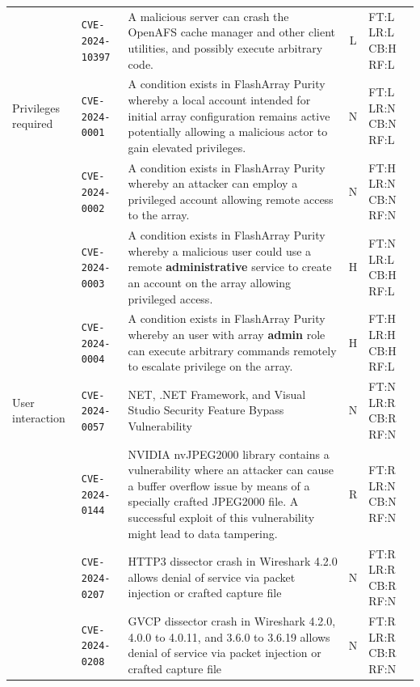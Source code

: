 \begin{table}[p]
\begin{tabular}{@{}llp{6.2cm}cl@{}}
 & \texttt{CVE-2024-10397} & A malicious server can crash the OpenAFS cache manager and other client utilities, and possibly execute arbitrary code. & L & FT:L LR:L CB:H RF:L \\
\addlinespace[3pt]
Privileges required & \texttt{CVE-2024-0001} & A condition exists in FlashArray Purity whereby a local account intended for initial array configuration remains active potentially allowing a malicious actor to gain elevated privileges. & N & FT:L LR:N CB:N RF:L \\
 & \texttt{CVE-2024-0002} & A condition exists in FlashArray Purity whereby an attacker can employ a privileged account allowing remote access to the array. & N & FT:H LR:N CB:N RF:N \\
 & \texttt{CVE-2024-0003} & A condition exists in FlashArray Purity whereby a malicious user could use a remote \textbf{administrative} service to create an account on the array allowing privileged access. & H & FT:N LR:L CB:H RF:L \\
 & \texttt{CVE-2024-0004} & A condition exists in FlashArray Purity whereby an user with array \textbf{admin} role can execute arbitrary commands remotely to escalate privilege on the array. & H & FT:H LR:H CB:H RF:L \\
\addlinespace[3pt]
User interaction & \texttt{CVE-2024-0057} & NET, .NET Framework, and Visual Studio Security Feature Bypass Vulnerability & N & FT:N LR:R CB:R RF:N \\
 & \texttt{CVE-2024-0144} & NVIDIA nvJPEG2000 library contains a vulnerability where an attacker can cause a buffer overflow issue by means of a specially crafted JPEG2000 file. A successful exploit of this vulnerability might lead to data tampering. & R & FT:R LR:N CB:N RF:N \\
 & \texttt{CVE-2024-0207} & HTTP3 dissector crash in Wireshark 4.2.0 allows denial of service via packet injection or crafted capture file & N & FT:R LR:R CB:R RF:N \\
 & \texttt{CVE-2024-0208} & GVCP dissector crash in Wireshark 4.2.0, 4.0.0 to 4.0.11, and 3.6.0 to 3.6.19 allows denial of service via packet injection or crafted capture file & N & FT:R LR:R CB:R RF:N \\
\bottomrule
\end{tabular}
\end{table}
